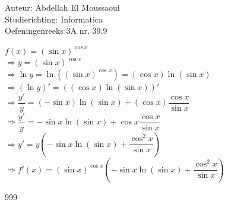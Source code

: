 \documentclass[a4paper]{article}
\begin{document}
  
\noindent \large Auteur: Abdellah El Moussaoui \\
\noindent \large Studierichting: Informatica\\
\noindent \large Oefeningenreeks 3A nr. 39.9\\

\medskip

\normalsize

$f(x)=\left(\sin x\right)^{\cos x}$\\

$\Rightarrow y=\left(\sin x\right)^{\cos x}$\\

$\Rightarrow  \ln y=\ln \left(\left(\sin x\right)^{\cos x}\right) = \left(\cos x\right) \ln \left(\sin x\right)$\\

$\Rightarrow \left(\ln y\right)'= \left(\left(\cos x\right) \ln \left(\sin x\right) \right)'$\\

$\Rightarrow \dfrac{y'}{y} = \left(-\sin x\right) \ln \left(\sin x\right)+\left(\cos x\right) \dfrac{\cos x}{\sin x}  $\\

$\Rightarrow \dfrac{y'}{y} = -\sin x\ln\left(\sin x\right)+\cos x\dfrac{\cos x}{\sin x}$\\

$\Rightarrow y' = y\left(-\sin x\ln\left(\sin x\right)+\dfrac{\cos^2 x}{\sin x}\right)$\\

$\Rightarrow f'(x) = \left(\sin x\right)^{\cos x}\left(-\sin x\ln\left(\sin x\right)+\dfrac{\cos^2 x}{\sin x}\right)$\\


\begin{thebibliography}{999}
\end{thebibliography}
\end{document}
